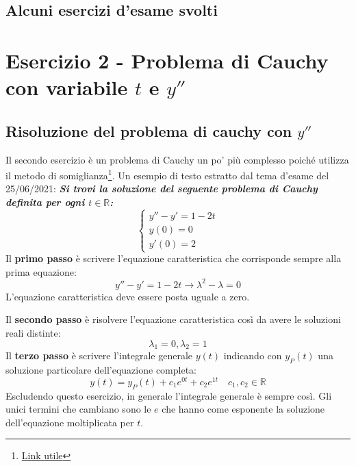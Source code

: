 \documentclass[a4paper]{article}
\begin{document}
	\subsection{Alcuni esercizi d'esame svolti}
	\newpage

	\section{Esercizio 2 - Problema di Cauchy con variabile $t$ e $y''$}

	\subsection{Risoluzione del problema di cauchy con $y''$}

	Il secondo esercizio è un problema di Cauchy un po' più complesso poiché utilizza il metodo di somiglianza\footnote{\href{https://youtu.be/Ij2V7cj_lh8}{Link utile}}. Un esempio di testo estratto dal tema d'esame del 25/06/2021: \textcolor{Green4}{\textbf{\emph{Si trovi la soluzione del seguente problema di Cauchy definita per ogni $t \in \mathbb{R}$:}}}
	\begin{equation*}
		\begin{cases}
			y'' - y' = 1 - 2t \\
			y\left(0\right) = 0 \\
			y'\left(0\right) = 2
		\end{cases}
	\end{equation*}
	Il \textbf{primo passo} è scrivere l'equazione caratteristica che corrisponde sempre alla prima equazione:
	\begin{equation*}
		y'' - y' = 1 - 2t \longrightarrow \lambda^{2} - \lambda = 0
	\end{equation*}
	L'equazione caratteristica deve essere posta uguale a zero.\newline

	\noindent
	Il \textbf{secondo passo} è risolvere l'equazione caratteristica così da avere le soluzioni reali distinte:
	\begin{equation*}
		\lambda_{1} = 0, \lambda_{2} = 1
	\end{equation*}
	Il \textbf{terzo passo} è scrivere l'integrale generale $y\left(t\right)$ indicando con $y_{P}\left(t\right)$ una soluzione particolare dell'equazione completa:
	\begin{equation*}
		y\left(t\right) = y_{P}\left(t\right) + c_{1}e^{0t} + c_{2}e^{1t} \hspace{1em} c_{1}, c_{2} \in \mathbb{R}
	\end{equation*}
	Escludendo questo esercizio, in generale l'integrale generale è sempre così. Gli unici termini che cambiano sono le $e$ che hanno come esponente la soluzione dell'equazione moltiplicata per $t$.\newline
\end{document}
